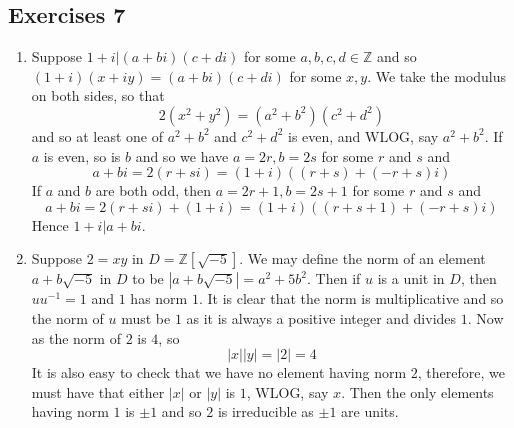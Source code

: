 \subsection{Exercises 7}
\begin{enumerate}
\item Suppose $1+i |(a+bi)(c+di)$ for some $a,b,c,d \in \mathbb{Z}$ and so
$(1+i)(x+iy)=(a+bi)(c+di)$ for some $x,y$. We take the modulus on both sides, so that
$$2(x^2+y^2)=(a^2+b^2)(c^2+d^2)$$
and so at least one of $a^2+b^2$ and $c^2+d^2$ is even, and WLOG, say $a^2+b^2$. If $a$ is even, so is $b$ and so we have $a=2r,b=2s$ for some $r$ and $s$ and
$$a+bi=2(r+si)=(1+i)((r+s)+(-r+s)i)$$
If $a$ and $b$ are both odd, then $a=2r+1,b=2s+1$ for some $r$ and $s$ and
$$a+bi=2(r+si)+(1+i)=(1+i)((r+s+1)+(-r+s)i)$$ Hence $1+i |a+bi$.
\item Suppose $2=xy$ in $D=\mathbb{Z}[\sqrt{-5}]$. We may define the norm of an element $a+b\sqrt{-5}$ in $D$ to be $|a+b\sqrt{-5}|=a^2+5b^2$. Then if $u$ is a unit in $D$, then $u u^{-1}=1$ and $1$ has norm $1$. It is clear that the norm is multiplicative and so the norm of $u$ must be $1$ as it is always a positive integer and divides $1$. Now as the norm of $2$ is $4$, so
    $$|x| |y|=|2|=4$$
    It is also easy to check that we have no element having norm $2$, therefore, we must have that
    either $|x|$ or $|y|$ is $1$, WLOG, say $x$. Then the only elements having norm $1$ is $\pm 1$ and so $2$ is irreducible as $\pm 1$ are units.


\end{enumerate}
